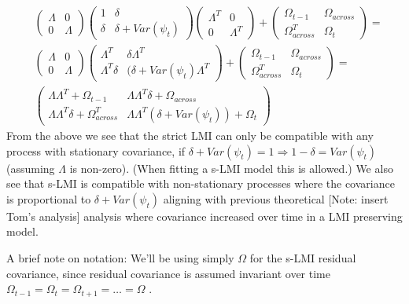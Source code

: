 \documentclass[
  letterpaper,
  DIV=11,
  numbers=noendperiod]{scrartcl}
\begin{document}
\[
\begin{align*}&\begin{pmatrix}    \Lambda & 0\\   0 & \Lambda \end{pmatrix} \begin{pmatrix}   1 & \delta \\   \delta & \delta+Var(\psi_t) \end{pmatrix} \begin{pmatrix}    \Lambda^T & 0\\   0 & \Lambda^T \end{pmatrix}+ \begin{pmatrix}   \Omega_{t-1} & \Omega_{across} \\   \Omega_{across}^T & \Omega_t \end{pmatrix} =\\
&\begin{pmatrix}    \Lambda & 0\\   0 & \Lambda \end{pmatrix} \begin{pmatrix}    \Lambda^T & \delta\Lambda^T\\   \Lambda^T\delta & (\delta+Var(\psi_t)\Lambda^T \end{pmatrix} + 
\begin{pmatrix}   
\Omega_{t-1} & \Omega_{across} \\   
\Omega_{across}^T & \Omega_t \end{pmatrix}=\\
& \begin{pmatrix}    
\Lambda\Lambda^T + \Omega_{t-1}& \Lambda\Lambda^T\delta + \Omega_{across}\\   
\Lambda\Lambda^T\delta + \Omega_{across}^T & \Lambda\Lambda^T(\delta+Var(\psi_t)) + \Omega_t 
\end{pmatrix} 
\end{align*}
\] From the above we see that the strict LMI can only be compatible with
any process with stationary covariance, if
\(\delta+Var(\psi_t)=1\Rightarrow1-\delta=Var(\psi_t)\) (assuming
\(\Lambda\) is non-zero). (When fitting a s-LMI model this is allowed.)
We also see that s-LMI is compatible with non-stationary processes where
the covariance is proportional to \(\delta+Var(\psi_t)\) aligning with
previous theoretical {[}Note: insert Tom's analysis{]} analysis where
covariance increased over time in a LMI preserving model.

A brief note on notation: We'll be using simply \(\Omega\) for the s-LMI
residual covariance, since residual covariance is assumed invariant over
time \(\Omega_{t-1}=\Omega_{t}=\Omega_{t+1}=…=\Omega\) .
\end{document}
